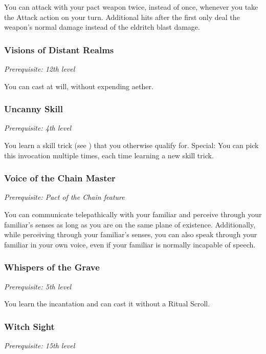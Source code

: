 You can attack with your pact weapon twice, instead of once, whenever you take the Attack action on your turn. Additional hits after the first only deal the weapon's normal damage instead of the eldritch blast damage.

\subsubsection{Visions of Distant Realms}

\textit{Prerequisite: 12th level}

You can cast  at will, without expending aether.

\subsubsection{Uncanny Skill}
\textit{Prerequisite: 4th level}

You learn a skill trick (see ) that you otherwise qualify for. Special: You can pick this invocation multiple times, each time learning a new skill trick.

\subsubsection{Voice of the Chain Master}

\textit{Prerequisite: Pact of the Chain feature}

You can communicate telepathically with your familiar and perceive through your familiar's senses as long as you are on the same plane of existence. Additionally, while perceiving through your familiar's senses, you can also speak through your familiar in your own voice, even if your familiar is normally incapable of speech.

\subsubsection{Whispers of the Grave}

\textit{Prerequisite: 5th level}

You learn the  incantation and can cast it without a Ritual Scroll.

\subsubsection{Witch Sight}

\textit{Prerequisite: 15th level}

